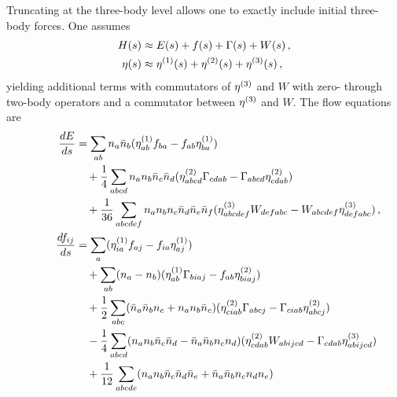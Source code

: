 Truncating at the three-body level allows one to exactly include initial three-body forces.
One assumes
\begin{align}
  H(s)    & \approx E(s) + f(s) + \Gamma(s) + W(s)\,,         \\
  \eta(s) & \approx \eta^{(1)}(s) + \eta^{(2)}(s) + \eta^{(3)}(s)\,,
\end{align}
yielding additional terms with commutators of $\eta^{(3)}$ and $W$
with zero- through two-body operators
and a commutator between $\eta^{(3)}$ and $W$.
The flow equations are
\begin{align}
  \phantom{\frac{dW_{ijklmn}}{ds}}
   & \begin{aligned}
    \mathllap{\frac{dE}{ds}} & = \sum_{ab} n_{a} \bar{n}_{b}
    (\genone_{ab} f_{ba} - f_{ab} \genone_{ba})                                                            \\
                             & \quad + \frac{1}{4} \sum_{abcd} n_{a}n_{b}\bar{n}_c \bar{n}_d
    (\gentwo_{abcd} \Gamma_{cdab} - \Gamma_{abcd}\gentwo_{cdab})                                           \\
                             & \quad + \frac{1}{36}\sum_{abcdef} n_a n_b n_c \bar{n}_d \bar{n}_e \bar{n}_f
    (\genthree_{abcdef} W_{defabc} - W_{abcdef} \genthree_{defabc})\,,
  \end{aligned}\label{eq:imsrg3_0body} \\
   & \begin{aligned}
    \mathllap{\frac{df_{ij}}{ds}} & =
    \sum_{a}(\genone_{ia} f_{aj} - f_{ia} \genone_{aj})                                                                       \\
                                  & \quad+\sum_{ab}(n_a - n_b)(\genone_{ab}\Gamma_{biaj} - f_{ab}\gentwo_{biaj})              \\
                                  & \quad+\frac{1}{2}\sum_{abc}(\bar{n}_a \bar{n}_b n_c + n_a n_b \bar{n}_c)
    (\gentwo_{ciab} \Gamma_{abcj} - \Gamma_{ciab} \gentwo_{abcj})                                                             \\
                                  & \quad - \frac{1}{4} \sum_{abcd}(n_a n_b \bar{n}_c \bar{n}_d -\bar{n}_a \bar{n}_b n_c n_d)
    (\gentwo_{cdab} W_{abijcd} - \Gamma_{cdab} \genthree_{abijcd})                                                            \\
                                  & \quad + \frac{1}{12}\sum_{abcde}
    (n_a n_b \bar{n}_c \bar{n}_d \bar{n}_e + \bar{n}_a \bar{n}_b n_c n_d n_e)

\end{aligned}
\end{align}
